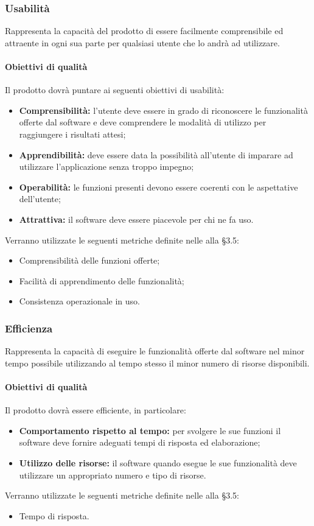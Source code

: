 \documentclass[PianoDiQualifica.tex]{subfiles}
\begin{document}
\subsubsection{Usabilità}
Rappresenta la capacità del prodotto di essere facilmente comprensibile ed attraente in ogni sua parte per qualsiasi utente che lo andrà ad utilizzare.
\paragraph{Obiettivi di qualità}
Il prodotto dovrà puntare ai seguenti obiettivi di usabilità:
\begin{itemize}
	\item \textbf{Comprensibilità:} l'utente deve essere in grado di riconoscere le funzionalità offerte dal software e deve comprendere le modalità di utilizzo per raggiungere i risultati attesi;
	\item \textbf{Apprendibilità:} deve essere data la possibilità all'utente di imparare ad utilizzare l'applicazione senza troppo impegno;
	\item \textbf{Operabilità:} le funzioni presenti devono essere coerenti con le aspettative dell'utente;
	\item \textbf{Attrattiva:} il software deve essere piacevole per chi ne fa uso.
\end{itemize}
Verranno utilizzate le seguenti metriche definite nelle \ndp alla \S{3.5}:
\begin{itemize}
	\item {} Comprensibilità delle funzioni offerte;
	\item {} Facilità di apprendimento delle funzionalità;
	\item {} Consistenza operazionale in uso.
\end{itemize}

\subsubsection{Efficienza}
Rappresenta la capacità di eseguire le funzionalità offerte dal software nel minor tempo possibile utilizzando al tempo stesso il minor numero di risorse disponibili.
\paragraph{Obiettivi di qualità}
Il prodotto dovrà essere efficiente, in particolare:
\begin{itemize}
	\item \textbf{Comportamento rispetto al tempo:} per svolgere le sue funzioni il software deve fornire adeguati tempi di risposta ed elaborazione;
	\item \textbf{Utilizzo delle risorse:} il software quando esegue le sue funzionalità deve utilizzare un appropriato numero e tipo di risorse.
\end{itemize}
Verranno utilizzate le seguenti metriche definite nelle \ndp alla \S{3.5}:
\begin{itemize}
	\item {} Tempo di risposta.
\end{itemize}
\end{document}
